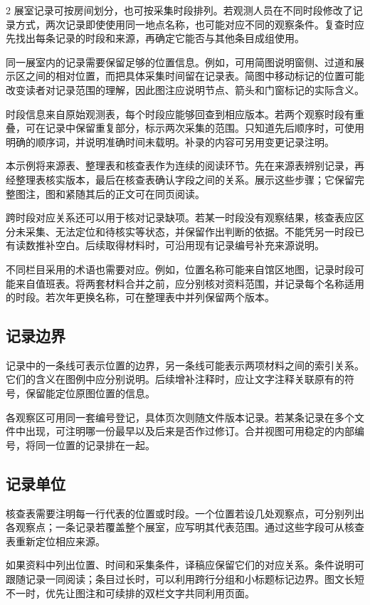 \begin{multicols}{2}
\noindent 展室记录可按房间划分，也可按采集时段排列。若观测人员在不同时段修改了记录方式，两次记录即使使用同一地点名称，也可能对应不同的观察条件。复查时应先找出每条记录的时段和来源，再确定它能否与其他条目成组使用。

同一展室内的记录需要保留足够的位置信息。例如，可用简图说明窗侧、过道和展示区之间的相对位置，而把具体采集时间留在记录表。简图中移动标记的位置可能改变读者对记录范围的理解，因此图注应说明节点、箭头和门窗标记的实际含义。

时段信息来自原始观测表，每个时段应能够回查到相应版本。若两个观察时段有重叠，可在记录中保留重复部分，标示两次采集的范围。只知道先后顺序时，可使用明确的顺序词，并说明准确时间未载明。补录的内容可另用变更记录注明。

本示例将来源表、整理表和核查表作为连续的阅读环节。先在来源表辨别记录，再经整理表核实版本，最后在核查表确认字段之间的关系。\NCRArticleFigure{}展示这些步骤；它保留完整图注，图和紧随其后的正文可在同页阅读。

跨时段对应关系还可以用于核对记录缺项。若某一时段没有观察结果，核查表应区分未采集、无法定位和待核实等状态，并保留作出判断的依据。不能凭另一时段已有读数推补空白。后续取得材料时，可沿用现有记录编号补充来源说明。

不同栏目采用的术语也需要对应。例如，位置名称可能来自馆区地图，记录时段可能来自值班表。将两套材料合并之前，应分别核对资料范围，并记录每个名称适用的时段。若次年更换名称，可在整理表中并列保留两个版本。

\subsection*{记录边界}
记录中的一条线可表示位置的边界，另一条线可能表示两项材料之间的索引关系。它们的含义在图例中应分别说明。后续增补注释时，应让文字注释关联原有的符号，保留能定位原图位置的信息。

各观察区可用同一套编号登记，具体页次则随文件版本记录。若某条记录在多个文件中出现，可注明哪一份最早以及后来是否作过修订。合并视图可用稳定的内部编号，将同一位置的记录排在一起。

\subsection*{记录单位}
核查表需要注明每一行代表的位置或时段。一个位置若设几处观察点，可分别列出各观察点；一条记录若覆盖整个展室，应写明其代表范围。通过这些字段可从核查表重新定位相应来源。

如果资料中列出位置、时间和采集条件，译稿应保留它们的对应关系。条件说明可跟随记录一同阅读；条目过长时，可以利用跨行分组和小标题标记边界。图文长短不一时，优先让图注和可续排的双栏文字共同利用页面。


\end{multicols}
